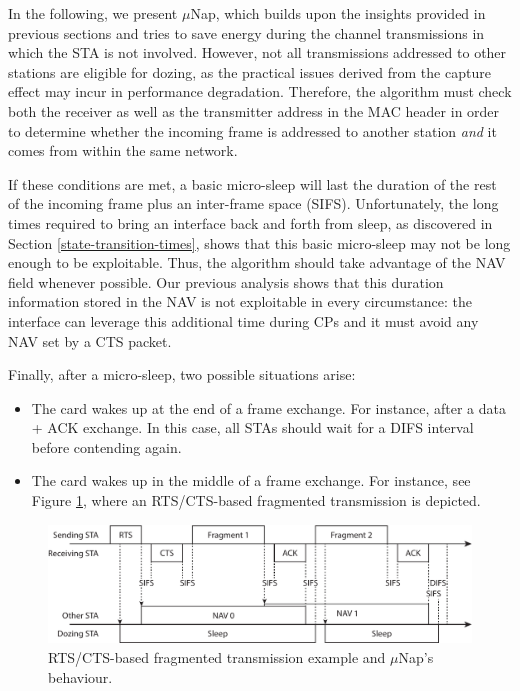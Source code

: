 \documentclass[twoside,nohyper]{tufte-book}
\providecommand{\tightlist}{%
  \setlength{\itemsep}{0pt}\setlength{\parskip}{0pt}}
\begin{document}
In the following, we present \(\mu\)Nap, which builds upon the insights provided in previous sections and tries to save energy during the channel transmissions in which the STA is not involved. However, not all transmissions addressed to other stations are eligible for dozing, as the practical issues derived from the capture effect may incur in performance degradation. Therefore, the algorithm must check both the receiver as well as the transmitter address in the MAC header in order to determine whether the incoming frame is addressed to another station \emph{and} it comes from within the same network.

If these conditions are met, a basic micro-sleep will last the duration of the rest of the incoming frame plus an inter-frame space (SIFS). Unfortunately, the long times required to bring an interface back and forth from sleep, as discovered in Section \ref{state-transition-times}, shows that this basic micro-sleep may not be long enough to be exploitable. Thus, the algorithm should take advantage of the NAV field whenever possible. Our previous analysis shows that this duration information stored in the NAV is not exploitable in every circumstance: the interface can leverage this additional time during CPs and it must avoid any NAV set by a CTS packet.

Finally, after a micro-sleep, two possible situations arise:

\begin{itemize}
\tightlist
\item
  The card wakes up at the end of a frame exchange. For instance, after a data + ACK exchange. In this case, all STAs should wait for a DIFS interval before contending again.
\item
  The card wakes up in the middle of a frame exchange. For instance, see Figure \ref{fig:fragments}, where an RTS/CTS-based fragmented transmission is depicted.
\end{itemize}



\begin{figure}

{\centering \includegraphics{img/05/fragments} 

}

\caption[RTS/CTS-based fragmented transmission example and \(\mu\)Nap's behaviour.]{RTS/CTS-based fragmented transmission example and \(\mu\)Nap's behaviour.}\label{fig:fragments}
\end{figure}
\end{document}

